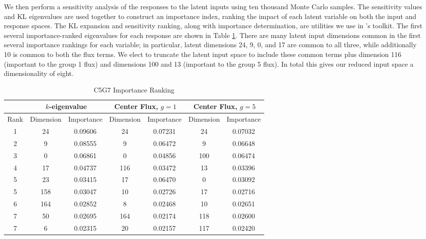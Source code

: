We then perform a sensitivity analysis of the responses to the latent inputs using ten thousand Monte Carlo samples.  
The sensitivity values and KL
eigenvalues are used together to construct an importance index, ranking the impact of each latent variable on
both the input and response spaces.  The KL expansion and sensitivity ranking, along with importance
determination, are utilities we use in \raven{}'s toolkit.  The first several importance-ranked eigenvalues
for each response are shown in Table \ref{tab:c5g7 importance}.  There are many latent input dimensions common
in the first several importance rankings for each variable; in particular, latent dimensions 24, 9, 0, and 17
are common to all three, while additionally 10 is common to both the flux terms.  We elect to truncate the
latent input space to include these common terms plus dimension 116 (important to the group 1 flux) and
dimensions 100 and 13 (important to the group 5 flux).  In total this gives our reduced input space a
dimensionality of eight.

\begin{table}
  \centering
  \begin{tabular}{|c|c c|c c|c c|} \hline
    & \multicolumn{2}{|c|}{$k$-eigenvalue} & \multicolumn{2}{|c|}{Center Flux, $g=1$} &
             \multicolumn{2}{|c|}{Center Flux, $g=5$} \\ \hline
    Rank & Dimension & Importance & Dimension & Importance & Dimension & Importance \\ \hline 
    1 &  24 & 0.09606 &  24 & 0.07231 &  24 &  0.07032  \\
    2 &   9 & 0.08555 &   9 & 0.06472 &   9 &  0.06648  \\
    3 &   0 & 0.06861 &   0 & 0.04856 & 100 &  0.06474  \\
    4 &  17 & 0.04737 & 116 & 0.03472 &  13 &  0.03396  \\
    5 &  23 & 0.03415 &  17 & 0.06470 &   0 &  0.03092  \\
    5 & 158 & 0.03047 &  10 & 0.02726 &  17 &  0.02716  \\
    6 & 164 & 0.02852 &   8 & 0.02468 &  10 &  0.02651  \\
    7 &  50 & 0.02695 & 164 & 0.02174 & 118 &  0.02600  \\
    7 &   6 & 0.02315 &  20 & 0.02157 & 117 &  0.02420  \\
  \hline \end{tabular}
  \caption{C5G7 Importance Ranking}
  \label{tab:c5g7 importance}
\end{table}


